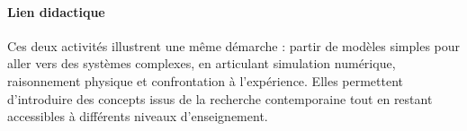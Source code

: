 \medskip

\paragraph{Lien didactique}
Ces deux activités illustrent une même démarche : partir de modèles simples
pour aller vers des systèmes complexes, en articulant simulation numérique,
raisonnement physique et confrontation à l’expérience. Elles permettent
d’introduire des concepts issus de la recherche contemporaine tout en restant
accessibles à différents niveaux d’enseignement.








